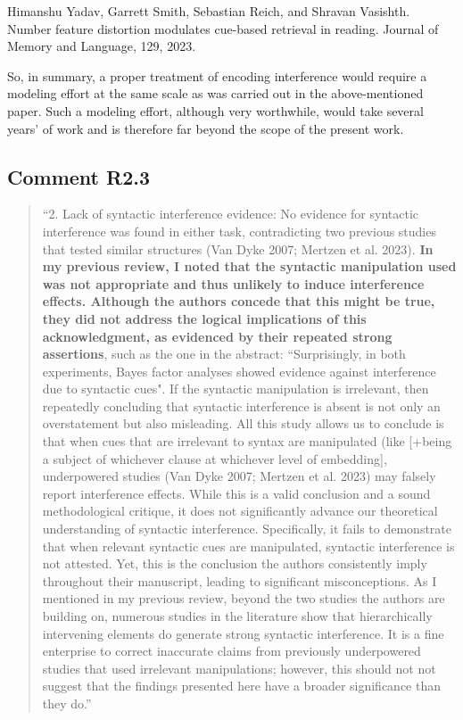 \documentclass[12pt]{article}
\begin{document}
Himanshu Yadav, Garrett Smith, Sebastian Reich, and Shravan Vasishth. Number feature distortion modulates cue-based retrieval in reading. Journal of Memory and Language, 129, 2023.

So, in summary, a proper treatment of encoding interference would require a modeling effort at the same scale as was carried out in the above-mentioned paper. Such a modeling effort, although very worthwhile, would take several years' of work and is therefore far beyond the scope of the present work.
 
\subsection*{Comment R2.3}

\begin{quote}
``2. Lack of syntactic interference evidence: No evidence for syntactic interference was found in either task, contradicting two previous studies that tested similar structures (Van Dyke 2007; Mertzen et al. 2023). \textbf{In my previous review, I noted that the syntactic manipulation used was not appropriate and thus unlikely to induce interference effects. Although the authors concede that this might be true, they did not address the logical implications of this acknowledgment, as evidenced by their repeated strong assertions}, such as the one in the abstract: ``Surprisingly, in both experiments, Bayes factor analyses showed evidence against interference due to syntactic cues".
If the syntactic manipulation is irrelevant, then repeatedly concluding that syntactic interference is absent is not only an overstatement but also misleading. All this study allows us to conclude is that when cues that are irrelevant to syntax are manipulated (like [+being a subject of whichever clause at whichever level of embedding], underpowered studies (Van Dyke 2007; Mertzen et al. 2023) may falsely report interference effects. While this is a valid conclusion and a sound methodological critique, it does not significantly advance our theoretical understanding of syntactic interference. Specifically, it fails to demonstrate that when relevant syntactic cues are manipulated, syntactic interference is not attested. Yet, this is the conclusion the authors consistently imply throughout their manuscript, leading to significant misconceptions. As I mentioned in my previous review, beyond the two studies the authors are building on, numerous studies in the literature show that hierarchically intervening elements do generate strong syntactic interference.
It is a fine enterprise to correct inaccurate claims from previously underpowered studies that used irrelevant manipulations; however, this should not not suggest that the findings presented here have a broader significance than they do.''
\end{quote}
\end{document}
